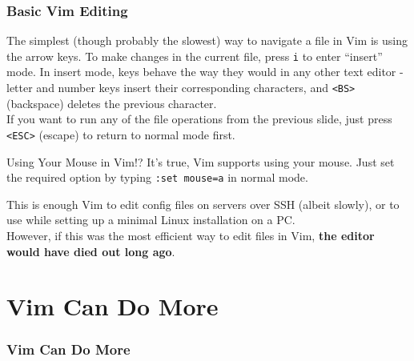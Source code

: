 \documentclass{beamer}
\begin{document}
\begin{frame}[fragile]
    \frametitle{Basic Vim Editing}
    \small
    The simplest (though probably the slowest) way to navigate a file in Vim is using the arrow keys. To make changes in the current file, press \verb+i+ to enter \enquote{insert} mode. In insert mode, keys behave the way they would in any other text editor - letter and number keys insert their corresponding characters, and \verb+<BS>+ (backspace) deletes the previous character. \\
    \vspace{0.5cm}
    If you want to run any of the file operations from the previous slide, just press \verb+<ESC>+ (escape) to return to normal mode first.
    \begin{block}{Using Your Mouse in Vim!?}
	It's true, Vim supports using your mouse. Just set the required option by typing \verb+:set mouse=a+ in normal mode.
    \end{block}
\end{frame}

\begin{frame}[fragile]
    \small This is enough Vim to edit config files on servers over SSH (albeit slowly), or to use while setting up a minimal Linux installation on a PC. \\
    \vspace{0.5cm}
    However, if this was the most efficient way to edit files in Vim, \textbf{the editor would have died out long ago}.
\end{frame}

\section{Vim Can Do More}

\begin{frame}[fragile]
    \frametitle{Vim Can Do More}
    \tableofcontents[currentsection]
\end{frame}
\end{document}
